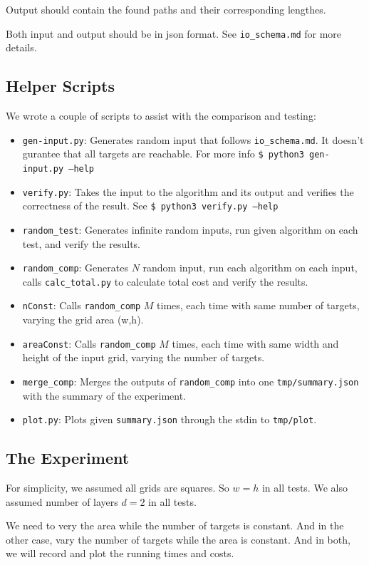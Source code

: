 Output should contain the found paths and their corresponding lengthes.

Both input and output should be in json format. See \texttt{io\_schema.md} for more details.

\subsection{Helper Scripts}
We wrote a couple of scripts to assist with the comparison and testing:
\begin{itemize}
    \item \texttt{gen-input.py}: Generates random input that follows \texttt{io\_schema.md}. It doesn't gurantee that all targets are reachable. For more info \texttt{\$ python3 gen-input.py --help}
    \item \texttt{verify.py}: Takes the input to the algorithm and its output and verifies the correctness of the result. See \texttt{\$ python3 verify.py --help}
    \item \texttt{random\_test}: Generates infinite random inputs, run given algorithm on each test, and verify the results.
    \item \texttt{random\_comp}: Generates $N$ random input, run each algorithm on each input, calls \texttt{calc\_total.py} to calculate total cost and verify the results.
    \item \texttt{nConst}: Calls \texttt{random\_comp} $M$ times, each time with same number of targets, varying the grid area (w,h).
    \item \texttt{areaConst}: Calls \texttt{random\_comp} $M$ times, each time with same width and height of the input grid, varying the number of targets.
    \item \texttt{merge\_comp}: Merges the outputs of \texttt{random\_comp} into one \texttt{tmp/summary.json} with the summary of the experiment.
    \item \texttt{plot.py}: Plots given \texttt{summary.json} through the stdin to \texttt{tmp/plot}.
\end{itemize}

\subsection{The Experiment}
For simplicity, we assumed all grids are squares. So $w=h$ in all tests.
We also assumed number of layers $d=2$ in all tests.

We need to very the area while the number of targets is constant. And in the other case, vary the number of targets while the area is constant.
And in both, we will record and plot the running times and costs.


